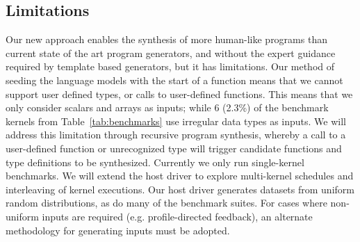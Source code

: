 \subsection{Limitations}

Our new approach enables the synthesis of more human-like programs than current state of the art program generators, and without the expert guidance required by template based generators, but it has limitations. Our method of seeding the language models with the start of a function means that we cannot support user defined types, or calls to user-defined functions. This means that we only consider scalars and arrays as inputs; while 6 (2.3\%) of the benchmark kernels from Table~\ref{tab:benchmarks} use irregular data types as inputs. We will address this limitation through recursive program synthesis, whereby a call to a user-defined function or unrecognized type will trigger candidate functions and type definitions to be synthesized. Currently we only run single-kernel benchmarks. We will extend the host driver to explore multi-kernel schedules and interleaving of kernel executions. Our host driver generates datasets from uniform random distributions, as do many of the benchmark suites. For cases where non-uniform inputs are required (e.g. profile-directed feedback), an alternate methodology for generating inputs must be adopted.
